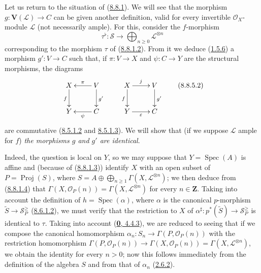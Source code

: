 \begin{env}[8.8.5]
\label{II.8.8.5}
Let us return to the situation of (\hyperref[II.8.8.1]{8.8.1}). We will see
that the morphism $g:\mathbf{V}(\mathcal{L})\to C$ can be given another
definition, valid for every invertible $\mathcal{O}_X$-module $\mathcal{L}$
(not necessarily ample). For this, consider the $f$-morphism
\begin{equation}
\label{II.8.8.5.1}
  \tau^\flat:\mathcal{S}\longrightarrow
  \bigoplus_{n\geqslant 0}\mathcal{L}^{\otimes n}
\tag{8.8.5.1}
\end{equation}
corresponding to the morphism $\tau$ of
(\hyperref[II.8.8.1.2]{8.8.1.2}). From it we deduce
(\hyperref[II.1.5.6]{1.5.6}) a morphism $g':V\to C$ such that, if
$\pi:V\to X$ and $\psi:C\to Y$ are the structural morphisms, the diagrams
\begin{equation}
\label{II.8.8.5.2}
  \xymatrix{
    X\ar[d]_{f} & V\ar[l]_{\pi}\ar[d]^{g'}\\
    Y & C\ar[l]^{\psi}
  }
  \qquad
  \xymatrix{
    X\ar[r]^{j}\ar[d]_{f} & V\ar[d]^{g'}\\
    Y\ar[r]_{\varepsilon} & C
  }
\tag{8.8.5.2}
\end{equation}
are commutative
(\hyperref[II.8.5.1.2]{8.5.1.2} and
\hyperref[II.8.5.1.3]{8.5.1.3}). We will show that (if we suppose
$\mathcal{L}$ ample for $f$) \emph{the morphisms $g$ and $g'$ are identical}.

Indeed, the question is local on $Y$, so we may suppose that
$Y=\operatorname{Spec}(A)$ is affine and (because of
(\hyperref[II.8.8.1.3]{8.8.1.3})) identify $X$ with an open subset of
$P=\operatorname{Proj}(S)$, where $S=A\oplus\bigoplus_{n\geqslant 1}\Gamma(X,\mathcal{L}^{\otimes n})$;
we then deduce from (\hyperref[II.8.8.1.4]{8.8.1.4}) that
$\Gamma(X,\mathcal{O}_P(n))=\Gamma(X,\mathcal{L}^{\otimes n})$ for every
$n\in\mathbf{Z}$. Taking into account the definition of
$h=\operatorname{Spec}(\alpha)$, where $\alpha$ is the canonical $p$-morphism
$\widetilde{S}\to\mathcal{S}_P^{\geqslant}$
(\hyperref[II.8.6.1.2]{8.6.1.2}), we must verify that the restriction to
$X$ of
$\alpha^\sharp:p^*(\widetilde{S})\to\mathcal{S}_P^{\geqslant}$ is
identical to $\tau$. Taking into account
(\hyperref[0.4.4.3]{\textbf{0}, 4.4.3}), we are reduced to seeing that if we compose
the canonical homomorphism
$\alpha_n:S_n\to\Gamma(P,\mathcal{O}_P(n))$ with the restriction
homomorphism $\Gamma(P,\mathcal{O}_P(n))\longrightarrow\Gamma(X,\mathcal{O}_P(n))=\Gamma(X,\mathcal{L}^{\otimes n})$,
we obtain the identity for every $n>0$; now this follows immediately from the
definition of the algebra $S$ and from that of $\alpha_n$
(\hyperref[II.2.6.2]{2.6.2}).
\end{env}

